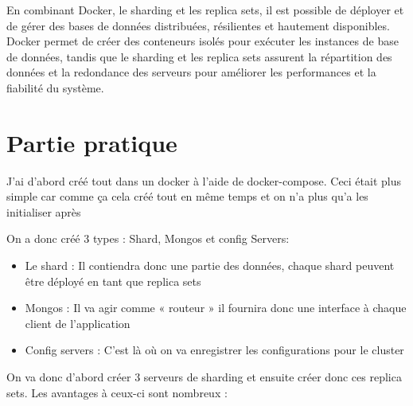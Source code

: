 En combinant Docker, le sharding et les replica sets, il est possible de déployer et de gérer des bases de
données distribuées, résilientes et hautement disponibles. Docker permet de créer des conteneurs
isolés pour exécuter les instances de base de données, tandis que le sharding et les replica sets assurent
la répartition des données et la redondance des serveurs pour améliorer les performances et la fiabilité
du système.

\section{Partie pratique}

J'ai d'abord créé tout dans un docker à l'aide de docker-compose.
Ceci était plus simple car comme ça cela créé tout en même temps et on n'a plus qu'a les initialiser
après

On a donc créé 3 types : Shard, Mongos et config Servers:

\begin{itemize}
    \item Le shard : Il contiendra donc une partie des données, chaque shard peuvent être déployé en
    tant que replica sets
    \item Mongos : Il va agir comme « routeur » il fournira donc une interface à chaque client de
    l'application
    \item Config servers : C'est là où on va enregistrer les configurations pour le cluster
\end{itemize}

On va donc d'abord créer 3 serveurs de sharding et ensuite créer donc ces replica sets.
Les avantages à ceux-ci sont nombreux :


